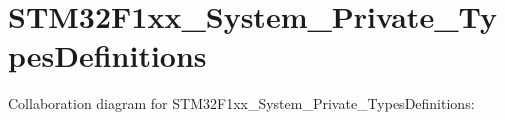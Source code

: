 \hypertarget{group__STM32F1xx__System__Private__TypesDefinitions}{}\section{S\+T\+M32\+F1xx\+\_\+\+System\+\_\+\+Private\+\_\+\+Types\+Definitions}
\label{group__STM32F1xx__System__Private__TypesDefinitions}
Collaboration diagram for S\+T\+M32\+F1xx\+\_\+\+System\+\_\+\+Private\+\_\+\+Types\+Definitions\+:
